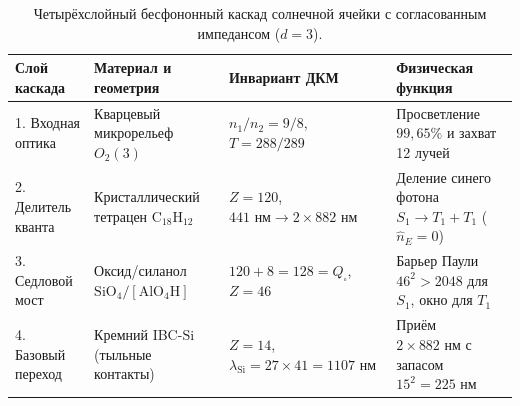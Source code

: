 \begin{table}[htbp]
\centering
\caption{Четырёхслойный бесфононный каскад солнечной ячейки с согласованным импедансом ($d=3$).}
\label{tab:lab-solar-cascade}
\small
\begin{tabular}{@{}llll@{}}
\toprule
\textbf{Слой каскада} & \textbf{Материал и геометрия} & \textbf{Инвариант ДКМ} & \textbf{Физическая функция} \\
\midrule
1. Входная оптика & Кварцевый микрорельеф $O_2(3)$ & $n_1/n_2 = 9/8$, $T = 288/289$ & Просветление $99{,}65\%$ и захват 12 лучей \\
2. Делитель кванта & Кристаллический тетрацен $\mathrm{C_{18}H_{12}}$ & $Z = 120$, $441\text{ нм} \to 2\times 882\text{ нм}$ & Деление синего фотона $S_1 \to T_1 + T_1$ ($\hat{n}_E=0$) \\
3. Седловой мост & Оксид/силанол $\mathrm{SiO_4} / [\mathrm{AlO_4H}]$ & $120 + 8 = 128 = Q_\square$, $Z = 46$ & Барьер Паули $46^2 > 2048$ для $S_1$, окно для $T_1$ \\
4. Базовый переход & Кремний IBC-$\mathrm{Si}$ (тыльные контакты) & $Z = 14$, $\lambda_{\mathrm{Si}} = 27\times 41 = 1107\text{ нм}$ & Приём $2\times 882\text{ нм}$ с запасом $15^2 = 225\text{ нм}$ \\
\bottomrule
\end{tabular}
\end{table}

